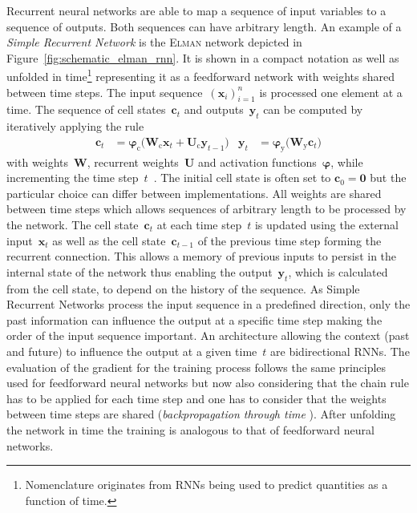 Recurrent neural networks are able to map a sequence of input variables to a
sequence of outputs. Both sequences can have arbitrary length. An example of a
\emph{Simple Recurrent Network} is the \textsc{Elman} network \cite{elman}
depicted in Figure~\ref{fig:schematic_elman_rnn}. It is shown in a compact
notation as well as unfolded in time\footnote{Nomenclature originates from RNNs
  being used to predict quantities as a function of time.} representing it as a
feedforward network with weights shared between time steps.
The input sequence~$\left( \mathbf{x}_i \right)_{i=1}^n$ is processed one
element at a time. The sequence of cell states~$\mathbf{c}_t$ and
outputs~$\mathbf{y}_t$ can be computed by iteratively applying the rule
\begin{align*}
  \mathbf{c}_t &= \bm{\varphi}_{\text{c}}\Big( \mathbf{W}_{\text{c}} \mathbf{x}_{t} + \mathbf{U}_{\text{c}} \mathbf{y}_{t-1} \Big)
  &\mathbf{y}_t &= \bm{\varphi}_{\text{y}}\Big( \mathbf{W}_{\text{y}} \mathbf{c}_{t} \Big)
\end{align*}
with weights~$\mathbf{W}$, recurrent weights~$\mathbf{U}$ and activation
functions~$\bm{\varphi}$, while incrementing the time step~$t$~\cite{elman,
  graves}. The initial cell state is often set to $\mathbf{c}_0 = \mathbf{0}$
but the particular choice can differ between implementations. All weights are
shared between time steps which allows sequences of arbitrary length to be
processed by the network. The cell state~$\mathbf{c}_t$ at each time step~$t$ is
updated using the external input~$\mathbf{x}_t$ as well as the cell
state~$\mathbf{c}_{t-1}$ of the previous time step forming the recurrent
connection. This allows a memory of previous inputs to persist in the internal
state of the network thus enabling the output~$\mathbf{y}_t$, which is
calculated from the cell state, to depend on the history of the sequence. As
Simple Recurrent Networks process the input sequence in a predefined direction,
only the past information can influence the output at a specific time step
making the order of the input sequence important. An architecture allowing the
context (past and future) to influence the output at a given time~$t$ are
bidirectional RNNs. The evaluation of the gradient for the training process
follows the same principles used for feedforward neural networks but now also
considering that the chain rule has to be applied for each time step and one has
to consider that the weights between time steps are shared
(\emph{backpropagation through time} \cite{williams_zipser}). After unfolding
the network in time the training is analogous to that of feedforward neural
networks.

